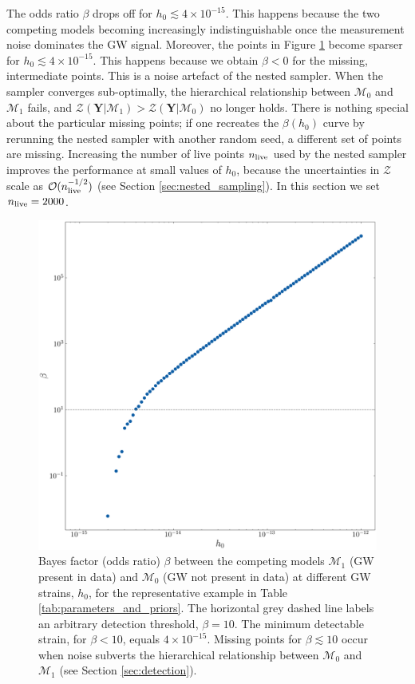 \documentclass[fleqn,usenatbib,useAMS]{mnras}
\begin{document}
The odds ratio $\beta$ drops off for $h_0 \lesssim 4 \times10^{-15}$. This happens because the two competing models becoming increasingly indistinguishable once the measurement noise dominates the GW signal. Moreover, the points in Figure \ref{fig:bayes} become sparser for $h_0 \lesssim 4 \times 10^{-15}$. This happens because we obtain $\beta <0$ for the missing, intermediate points. This is a noise artefact of the nested sampler. When the sampler converges sub-optimally, the hierarchical relationship between $\mathcal{M}_0$ and  $\mathcal{M}_1$ fails, and $\mathcal{Z}(\boldsymbol{Y} | \mathcal{M}_1) > \mathcal{Z}(\boldsymbol{Y} | \mathcal{M}_0)$ no longer holds. There is nothing special about the particular missing points; if one recreates the $\beta(h_0)$ curve by rerunning the nested sampler with another random seed, a different set of points are missing. Increasing the number of live points $n_{\rm live}$ used by the nested sampler improves the performance at small values of $h_0$, because the uncertainties in $\mathcal{Z}$ scale as $\mathcal{O}(n_{\rm live}^{-1/2})$ (see Section \ref{sec:nested_sampling}). In this section we set $n_{\rm live} =2000$. 
\begin{figure}
	\includegraphics[width=\columnwidth]{images/CanonicalBayesPlot2000}
	\caption{Bayes factor (odds ratio) $\beta$ between the competing models $\mathcal{M}_1$ (GW present in data) and $\mathcal{M}_0$ (GW not present in data) at different GW strains, $h_0$, for the representative example in Table \ref{tab:parameters_and_priors}. The horizontal grey dashed line labels an arbitrary detection threshold, $\beta = 10$. The minimum detectable strain, for $\beta < 10$, equals $4 \times 10^{-15}$. Missing points for $\beta \lesssim 10$ occur when noise subverts the hierarchical relationship between $\mathcal{M}_0$ and $\mathcal{M}_1$ (see Section \ref{sec:detection}).}
	\label{fig:bayes}
\end{figure}
\end{document}
